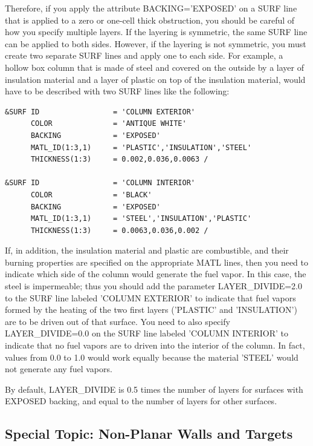 \documentclass[11pt]{book}
\begin{document}
Therefore, if you apply the attribute {\ct BACKING='EXPOSED'} on a {\ct SURF} line that is applied to a zero or one-cell thick
obstruction, you should be careful of how you specify multiple layers. If the layering is symmetric, the same {\ct SURF} line can
be applied to both sides. However, if the layering is not symmetric, you must create two separate {\ct SURF} lines and apply
one to each side. For example, a hollow box column that is made of steel and covered on the outside by a layer of insulation
material and a layer of plastic on top of the insulation material, would have to be described with two {\ct SURF} lines like the following:
\begin{lstlisting}
&SURF ID                 = 'COLUMN EXTERIOR'
      COLOR              = 'ANTIQUE WHITE'
      BACKING            = 'EXPOSED'
      MATL_ID(1:3,1)     = 'PLASTIC','INSULATION','STEEL'
      THICKNESS(1:3)     = 0.002,0.036,0.0063 /

&SURF ID                 = 'COLUMN INTERIOR'
      COLOR              = 'BLACK'
      BACKING            = 'EXPOSED'
      MATL_ID(1:3,1)     = 'STEEL','INSULATION','PLASTIC'
      THICKNESS(1:3)     = 0.0063,0.036,0.002 /
\end{lstlisting}
If, in addition, the insulation material and plastic are combustible, and their burning properties are specified on the appropriate {\ct MATL} lines,
then you need to indicate which side of the column would generate the fuel vapor. In this case, the steel is impermeable; thus you should add the parameter
{\ct LAYER\_DIVIDE=2.0} to the {\ct SURF} line labeled {\ct 'COLUMN EXTERIOR'} to indicate that fuel vapors formed by the heating of the
two first layers ({\ct 'PLASTIC'} and {\ct 'INSULATION'}) are to be driven out of that surface.
You need to also specify {\ct LAYER\_DIVIDE=0.0} on the {\ct SURF} line labeled {\ct 'COLUMN INTERIOR'} to indicate that no fuel
vapors are to driven into the interior of the column. In fact, values from 0.0 to 1.0 would work equally because the material
{\ct 'STEEL'} would not generate any fuel vapors.

By default, {\ct LAYER\_DIVIDE} is 0.5 times the number of layers for surfaces with {\ct EXPOSED} backing, and equal to the number of
layers for other surfaces.


\subsection{Special Topic: Non-Planar Walls and Targets}
\end{document}
